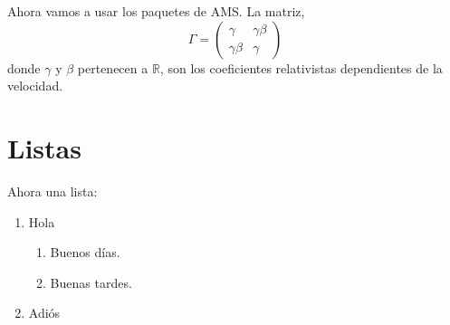 \documentclass[letter,12pt]{article}
\begin{document}
Ahora vamos a usar los paquetes de AMS. La matriz,
$$\Gamma=\left(
\begin{matrix}
\gamma&\gamma\beta\\
\gamma\beta&\gamma
\end{matrix}
\right)
$$
donde $\gamma$ y $\beta$ pertenecen a $\mathbb{R}$, 
son los coeficientes relativistas dependientes de la velocidad.

\section{Listas}
Ahora una lista:

\begin{enumerate}
 \item Hola
 \begin{enumerate}
 \renewcommand{\labelenumii}{\labelenumi.\roman{enumii}}
 \item Buenos días.
 \item Buenas tardes.
 \end{enumerate}
 \item Adiós
 \end{enumerate}
 
\end{document}
